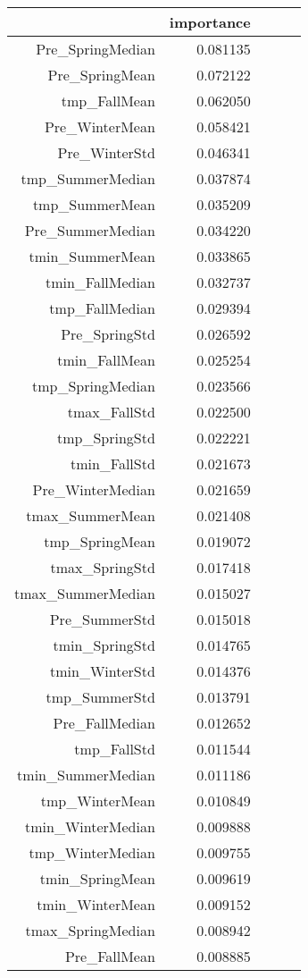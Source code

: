 \begin{tabular}{rrrrr}
\toprule
 & importance \\
\midrule
Pre_SpringMedian & 0.081135 \\
Pre_SpringMean & 0.072122 \\
tmp_FallMean & 0.062050 \\
Pre_WinterMean & 0.058421 \\
Pre_WinterStd & 0.046341 \\
tmp_SummerMedian & 0.037874 \\
tmp_SummerMean & 0.035209 \\
Pre_SummerMedian & 0.034220 \\
tmin_SummerMean & 0.033865 \\
tmin_FallMedian & 0.032737 \\
tmp_FallMedian & 0.029394 \\
Pre_SpringStd & 0.026592 \\
tmin_FallMean & 0.025254 \\
tmp_SpringMedian & 0.023566 \\
tmax_FallStd & 0.022500 \\
tmp_SpringStd & 0.022221 \\
tmin_FallStd & 0.021673 \\
Pre_WinterMedian & 0.021659 \\
tmax_SummerMean & 0.021408 \\
tmp_SpringMean & 0.019072 \\
tmax_SpringStd & 0.017418 \\
tmax_SummerMedian & 0.015027 \\
Pre_SummerStd & 0.015018 \\
tmin_SpringStd & 0.014765 \\
tmin_WinterStd & 0.014376 \\
tmp_SummerStd & 0.013791 \\
Pre_FallMedian & 0.012652 \\
tmp_FallStd & 0.011544 \\
tmin_SummerMedian & 0.011186 \\
tmp_WinterMean & 0.010849 \\
tmin_WinterMedian & 0.009888 \\
tmp_WinterMedian & 0.009755 \\
tmin_SpringMean & 0.009619 \\
tmin_WinterMean & 0.009152 \\
tmax_SpringMedian & 0.008942 \\
Pre_FallMean & 0.008885 \\

\end{tabular}
